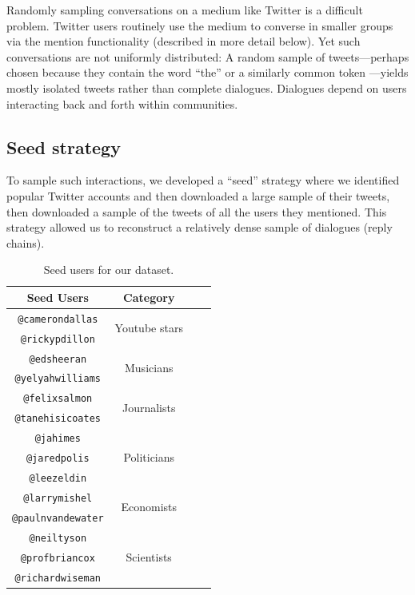 \documentclass[11pt,letterpaper]{article}
\begin{document}
Randomly sampling conversations on a medium like Twitter is a difficult problem. Twitter users routinely use the medium to converse in smaller groups via the \@ mention functionality (described in more detail below). Yet such conversations are not uniformly distributed: A random sample of tweets---perhaps chosen because they contain the word ``the'' or a similarly common token \cite{doyle2014}---yields mostly isolated tweets rather than complete dialogues. Dialogues depend on users interacting back and forth within communities.  %

\subsection{Seed strategy}

To sample such interactions, we developed a ``seed'' strategy where we identified popular Twitter accounts and then downloaded a large sample of their tweets, then downloaded a sample of the tweets of all the users they mentioned. This strategy allowed us to reconstruct a relatively dense sample of dialogues (reply chains).

\begin{table}
\begin{center}
\begin{tabular}{|c|c|c|c|}
\hline
Seed Users & Category \\ %
\hline
{\tt @camerondallas} & \multirow{2}{*}{Youtube stars} \\
{\tt @rickypdillon} & \\
\hline
{\tt @edsheeran} & \multirow{2}{*}{Musicians} \\
{\tt @yelyahwilliams} & \\
\hline
{\tt @felixsalmon} & \multirow{2}{*}{Journalists} \\
{\tt @tanehisicoates} & \\
\hline
{\tt @jahimes} & \multirow{3}{*}{Politicians} \\
{\tt @jaredpolis} & \\
{\tt @leezeldin} & \\
\hline
{\tt @larrymishel} & \multirow{2}{*}{Economists} \\
{\tt @paulnvandewater} & \\
\hline
{\tt @neiltyson} & \multirow{3}{*}{Scientists} \\
{\tt @profbriancox} & \\
{\tt @richardwiseman} & \\
\hline
\end{tabular}
\end{center}
\caption{\label{tab:seed-users} Seed users for our dataset.}
\end{table}
\end{document}
